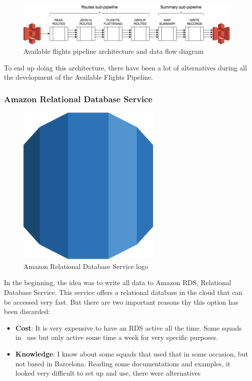 \begin{figure}[H]
\centering
\includegraphics[scale=0.45]{diagrams/available-flights-pipeline-architecture.png}
\caption{Available flights pipeline architecture and data flow diagram}
\end{figure}

To end up doing this architecture, there have been a lot of alternatives during all the development of the Available Flights Pipeline.

\subsubsection*{Amazon Relational Database Service} \label{rds}

\begin{figure}[H]
\centering
\includegraphics[scale=0.1]{resources/rds-logo.png}
\caption{Amazon Relational Database Service logo}
\end{figure}

In the beginning, the idea was to write all data to Amazon RDS, Relational Database Service\cite{rds}. This service offers a relational database in the cloud that can be accessed very fast. But there are two important reasons thy this option has been discarded:

\begin{itemize}
    \item \textbf{Cost}: It is very expensive to have an RDS active all the time. Some squads in \company\ use  but only active some time a week for very specific purposes.
    \item \textbf{Knowledge}: I know about some squads that used that in some occasion, but not based in Barcelona. Reading some documentations and examples, it looked very difficult to set up and use, there were alternatives 
\end{itemize}

